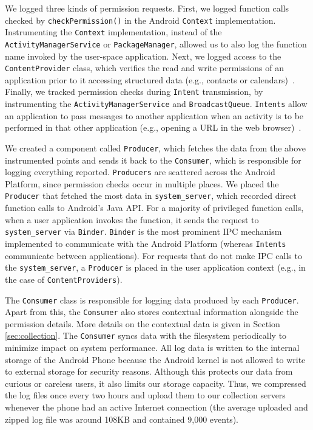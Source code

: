 \documentclass[letterpaper,twocolumn,10pt]{article}
\begin{document}
We logged three kinds of permission requests. First, we logged function calls checked by {\tt checkPermission()} in the Android {\tt Context} implementation. Instrumenting the {\tt Context} implementation, instead of the {\tt ActivityManagerService} or {\tt PackageManager}, allowed us to also log the function name invoked by the user-space application. Next, we logged access to the {\tt ContentProvider} class, which verifies the read and write permissions of an application prior to it accessing structured data (e.g., contacts or calendars)~\cite{AndroidContentProviders}. Finally, we tracked permission checks during {\tt Intent} transmission, by instrumenting the {\tt ActivityManagerService} and {\tt BroadcastQueue}. {\tt Intents} allow an application to pass messages to another application when an activity is to be performed in that other application (e.g., opening a URL in the web browser)~\cite{AndroidIntents}.

We created a component called {\tt Producer}, which fetches the data from the above instrumented points and sends it back to the {\tt Consumer}, which is responsible for logging everything reported. {\tt Producers} are scattered across the Android Platform, since permission checks occur in multiple places. We placed the {\tt Producer} that fetched the most data in {\tt system\_server}, which recorded direct function calls to Android's Java API. For a majority of privileged function calls, when a user application invokes the function, it sends the request to {\tt system\_server} via {\tt Binder}. {\tt Binder} is the most prominent IPC mechanism implemented to communicate with the Android Platform (whereas {\tt Intents} communicate between applications). For requests that do not make IPC calls to the {\tt system\_server}, a {\tt Producer} is placed in the user application context (e.g., in the case of {\tt ContentProviders}).







The {\tt Consumer} class is responsible for logging data produced by each {\tt Producer}. Apart from this, the {\tt Consumer} also stores contextual information alongside the permission details. More details on the contextual data is given in Section \ref{sec:collection}. The {\tt Consumer} syncs data with the filesystem periodically to minimize impact on system performance. All log data is written to the internal storage of the Android Phone because the Android kernel is not allowed to write to external storage for security reasons. Although this protects our data from curious or careless users, it also limits our storage capacity. Thus, we compressed the log files once every two hours and upload them to our collection servers whenever the phone had an active Internet connection (the average uploaded and zipped log file was around 108KB and contained 9,000 events).
\end{document}
